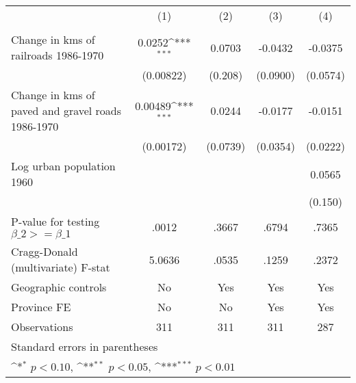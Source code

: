 {
\def\sym#1{\ifmmode^{#1}\else\(^{#1}\)\fi}
\begin{tabular}{l*{4}{c}}
\hline\hline
                &\multicolumn{1}{c}{(1)}&\multicolumn{1}{c}{(2)}&\multicolumn{1}{c}{(3)}&\multicolumn{1}{c}{(4)}\\
                &\multicolumn{1}{c}{}&\multicolumn{1}{c}{}&\multicolumn{1}{c}{}&\multicolumn{1}{c}{}\\
\hline
Change in kms of railroads 1986-1970&   0.0252\sym{***}&   0.0703         &  -0.0432         &  -0.0375         \\
                &(0.00822)         &  (0.208)         & (0.0900)         & (0.0574)         \\
[1em]
Change in kms of paved and gravel roads 1986-1970&  0.00489\sym{***}&   0.0244         &  -0.0177         &  -0.0151         \\
                &(0.00172)         & (0.0739)         & (0.0354)         & (0.0222)         \\
[1em]
Log urban population 1960&                  &                  &                  &   0.0565         \\
                &                  &                  &                  &  (0.150)         \\
\hline
P-value for testing $\beta\_{2} >= \beta\_{1}$&    .0012         &    .3667         &    .6794         &    .7365         \\
Cragg-Donald (multivariate) F-stat&   5.0636         &    .0535         &    .1259         &    .2372         \\
Geographic controls&       No         &      Yes         &      Yes         &      Yes         \\
Province FE     &       No         &       No         &      Yes         &      Yes         \\
Observations    &      311         &      311         &      311         &      287         \\
\hline\hline
\multicolumn{5}{l}{\footnotesize Standard errors in parentheses}\\
\multicolumn{5}{l}{\footnotesize \sym{*} \(p<0.10\), \sym{**} \(p<0.05\), \sym{***} \(p<0.01\)}\\
\end{tabular}
}
